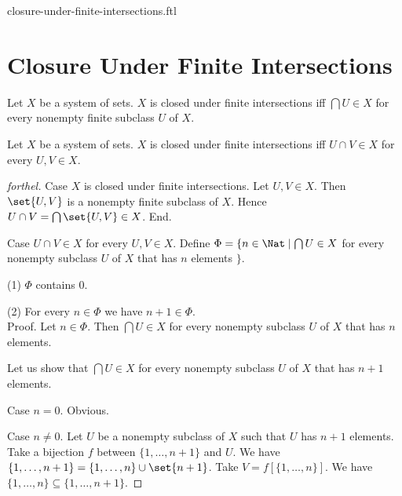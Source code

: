 \documentclass{naproche-library}
\begin{document}
\begin{smodule}{closure-under-finite-intersections.ftl}

  \section*{Closure Under Finite Intersections}

  \begin{definition}[forthel,id=FOUNDATIONS_14_4297814324543488]
    Let $X$ be a system of sets.
    $X$ is closed under finite intersections iff $\bigcap U \in X$ for every nonempty finite subclass $U$ of $X$.
  \end{definition}

  \begin{proposition}[forthel,id=FOUNDATIONS_17_1405012582334464]
    Let $X$ be a system of sets.
    $X$ is closed under finite intersections iff $U \cap V \in X$ for every $U, V \in X$.
  \end{proposition}
  \begin{proof}[forthel]
    Case $X$ is closed under finite intersections.
      Let $U, V \in X$.
      Then $\set{U, V}$ is a nonempty finite subclass of $X$.
      Hence $U \cap V = \bigcap \set{U, V} \in X$.
    End.

    Case $U \cap V \in X$ for every $U, V \in X$.
      Define $\Phi = \{ n \in \Nat \mid \bigcap U \in X$ for every nonempty subclass $U$ of $X$ that has $n$ elements $\}$.

      (1) $\Phi$ contains $0$.

      (2) For every $n \in \Phi$ we have $n + 1 \in \Phi$. \\
      Proof.
        Let $n \in \Phi$.
        Then $\bigcap U \in X$ for every nonempty subclass $U$ of $X$ that has $n$ elements.

        Let us show that $\bigcap U \in X$ for every nonempty subclass $U$ of $X$ that has $n + 1$ elements.

          Case $n = 0$. Obvious.

          Case $n \neq 0$.
            Let $U$ be a nonempty subclass of $X$ such that $U$ has $n + 1$ elements.
            Take a bijection $f$ between $\{1, \dots, n + 1 \}$ and $U$.
            We have $\{ 1, \dots, n + 1 \} = \{ 1, \dots, n \} \cup \set{n + 1}$.
            Take $V = f[\{ 1, \dots, n \}]$.
            We have $\{ 1, \dots, n \} \subseteq \{ 1, \dots, n + 1 \}$.


\end{proof}
\end{smodule}
\end{document}
